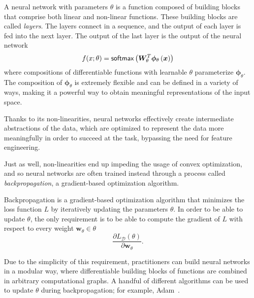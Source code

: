 \begin{definition}
    A neural network with parameters $\theta$ is a function
    composed of building blocks that comprise both linear and non-linear
    functions. These building blocks are called \textit{layers}.
    The layers connect in a sequence, and the output of each
    layer is fed into the next layer. The output of the last layer is
    the output of the neural network
    \begin{equation}
        f(x; \theta) = \operatorname*{\mathsf{softmax}} 
        \left(\bm{W}_{\theta}^T\bm{\phi}_{\theta}\left(\bm{x}\right)\right)
    \end{equation}
    where compositions of differentiable functions with learnable
    $\theta$ parameterize $\bm{\phi}_{\theta}$. The composition
    of $\bm{\phi}_{\theta}$ is extremely flexible and can be
    defined in a variety of ways, making it a powerful way
    to obtain meaningful representations of the input space.
\end{definition}
%
Thanks to its non-linearities, neural networks effectively create
intermediate abstractions of the data, which are optimized to represent the data
more meaningfully in order to succeed at the task, bypassing the need
for feature engineering.

Just as well, non-linearities end up
impeding the usage of convex optimization, and so neural networks are
often trained instead through a process called
\textit{backpropagation}, a gradient-based optimization algorithm.

\newpage %

\begin{definition}[backpropagation]
    Backpropagation is a gradient-based optimization algorithm that
    minimizes the loss function $L$ by iteratively updating the
    parameters $\theta$. In order to be able to update $\theta$,
    the only requirement is to be able to compute the gradient of
    $L$ with respect to every weight $\bm{w}_\theta\in\theta$
    \begin{equation}
        \frac{\partial L_{\mathcal{D}}(\theta)}{\partial \bm{w}_\theta}.
    \end{equation}
\end{definition}

Due to the simplicity of this requirement, practitioners can build
neural networks in a modular way, where differentiable building
blocks of functions are combined in arbitrary computational graphs. A
handful of different algorithms can be used to update $\theta$ during
backpropagation; for example, Adam~\citep{kingma2014adam}.

